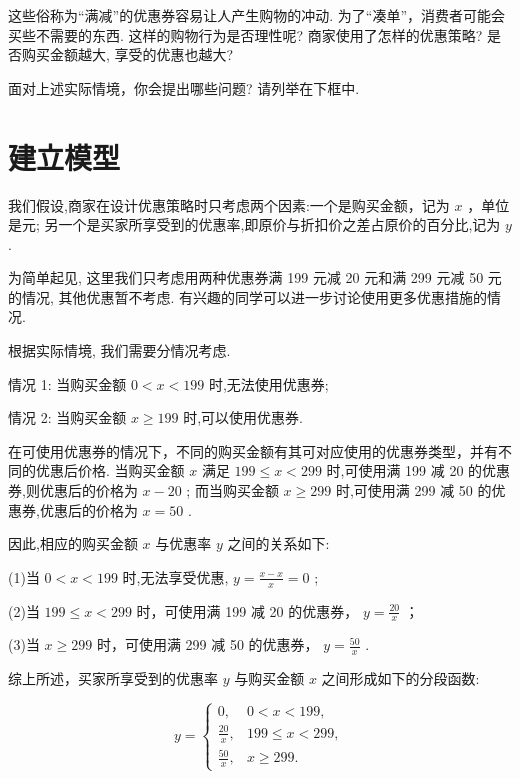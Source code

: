 \documentclass[10pt]{article}
\newcommand*\circled[1]{\tikz[baseline=(char.base)]{\node[shape=circle,draw,inner sep=1.5pt] (char) {\small #1};}}
\begin{document}
这些俗称为“满减”的优惠券容易让人产生购物的冲动. 为了“凑单”，消费者可能会买些不需要的东西. 这样的购物行为是否理性呢? 商家使用了怎样的优惠策略? 是否购买金额越大, 享受的优惠也越大?

面对上述实际情境，你会提出哪些问题? 请列举在下框中.

\section*{}

\section*{建立模型}

我们假设,商家在设计优惠策略时只考虑两个因素:一个是购买金额，记为 \(x\) ，单位是元; 另一个是买家所享受到的优惠率,即原价与折扣价之差占原价的百分比,记为 \(y\) .

为简单起见, 这里我们只考虑用两种优惠券满 199 元减 20 元和满 299 元减 50 元的情况, 其他优惠暂不考虑. 有兴趣的同学可以进一步讨论使用更多优惠措施的情况.

根据实际情境, 我们需要分情况考虑.

情况 1: 当购买金额 \(0 < x < {199}\) 时,无法使用优惠券;

情况 2: 当购买金额 \(x \geq  {199}\) 时,可以使用优惠券.

在可使用优惠券的情况下，不同的购买金额有其可对应使用的优惠券类型，并有不同的优惠后价格. 当购买金额 \(x\) 满足 \({199} \leq  x < {299}\) 时,可使用满 199 减 20 的优惠券,则优惠后的价格为 \(x - {20}\) ; 而当购买金额 \(x \geq  {299}\) 时,可使用满 299 减 50 的优惠券,优惠后的价格为 \(x = {50}\) .

因此,相应的购买金额 \(x\) 与优惠率 \(y\) 之间的关系如下:

(1)当 \(0 < x < {199}\) 时,无法享受优惠, \(y = \frac{x - x}{x} = 0\) ;

(2)当 \({199} \leq  x < {299}\) 时，可使用满 199 减 20 的优惠券， \(y = \frac{20}{x}\) ；

(3)当 \(x \geq  {299}\) 时，可使用满 299 减 50 的优惠券， \(y = \frac{50}{x}\) .

综上所述，买家所享受到的优惠率 \(y\) 与购买金额 \(x\) 之间形成如下的分段函数:

\[
y = \left\{  \begin{array}{ll} 0, & 0 < x < {199}, \\  \frac{20}{x}, & {199} \leq  x < {299}, \\  \frac{50}{x}, & x \geq  {299}. \end{array}\right.
\]
  \circled{1} 
\end{document}
